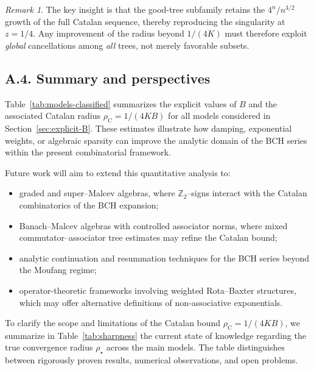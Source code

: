 \documentclass[11pt]{amsart}
\numberwithin{equation}{section}
\theoremstyle{remark}
\newtheorem{remark}[theorem]{Remark}
\begin{document}
\begin{remark}
The key insight is that the good-tree subfamily retains the $4^n/n^{3/2}$ 
growth of the full Catalan sequence, thereby reproducing the singularity 
at $z = 1/4$. Any improvement of the radius beyond $1/(4K)$ must therefore 
exploit \emph{global} cancellations among \emph{all} trees, not merely 
favorable subsets.
\end{remark}


\subsection{A.4. Summary and perspectives}

Table~\ref{tab:models-classified} summarizes the explicit values of $B$ and the associated Catalan radius $\rho_{\mathrm{C}} = 1/(4KB)$ for all models considered in Section~\ref{sec:explicit-B}. These estimates illustrate how damping, exponential weights, or algebraic sparsity can improve the analytic domain of the BCH series within the present combinatorial framework.

\smallskip
\noindent
Future work will aim to extend this quantitative analysis to:\begin{itemize}
\item graded and super--Malcev algebras, where $\mathbb{Z}_2$--signs interact with the Catalan combinatorics of the BCH expansion;
\item Banach--Malcev algebras with controlled associator norms, where mixed commutator--associator tree estimates may refine the Catalan bound;
\item analytic continuation and resummation techniques for the BCH series beyond the Moufang regime;
\item operator-theoretic frameworks involving weighted Rota--Baxter structures, which may offer alternative definitions of non-associative exponentials.
\end{itemize}
To clarify the scope and limitations of the Catalan bound $\rho_{\mathrm{C}} = 1/(4KB)$, we summarize in Table~\ref{tab:sharpness} the current state of knowledge regarding the true convergence radius $\rho_\star$ across the main models. The table distinguishes between rigorously proven results, numerical observations, and open problems.
\end{document}
